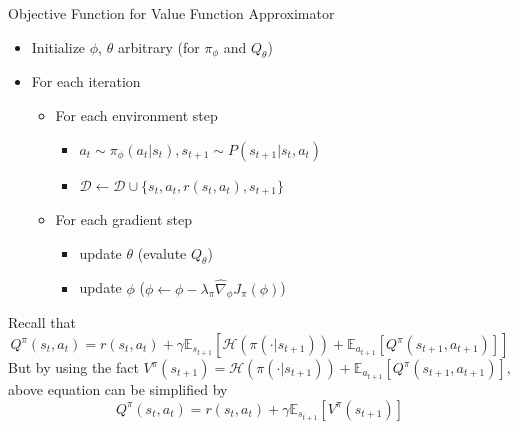 \documentclass[8pt]{beamer}
\begin{document}
\begin{frame}{Objective Function for Value Function Approximator}
    \begin{itemize}
        \item Initialize $\phi$, $\theta$ arbitrary (for $\pi_\phi$ and $Q_\theta$)
        \item For each iteration
        \begin{itemize}
            \item For each environment step
            \begin{itemize}
                \item $a_t \sim \pi_\phi(a_t | s_t), s_{t+1} \sim P(s_{t+1}|s_t, a_t)$
                \item $\mathcal{D} \leftarrow \mathcal{D} \cup \{s_t, a_t, r(s_t, a_t), s_{t+1}\}$            
            \end{itemize}
            \item For each gradient step
            \begin{itemize}
                \item update $\theta$ (evalute $Q_\theta$)
                \item update $\phi$ (\(\phi \leftarrow \phi - \lambda_\pi \hat{\nabla}_\phi J_\pi(\phi)\))
            \end{itemize}
        \end{itemize}
    \end{itemize}

    Recall that \[ Q^\pi (s_t,a_t) = r(s_t,a_t) + \gamma \mathbb{E}_{s_{t+1}} [\mathcal{H}(\pi(\cdot | s_{t+1})) + \mathbb{E}_{a_{t+1}}[Q^\pi (s_{t+1}, a_{t+1})]] \]
    But by using the fact \(V^\pi(s_{t+1}) = \mathcal{H}(\pi(\cdot | s_{t+1})) + \mathbb{E}_{a_{t+1}}[Q^\pi(s_{t+1}, a_{t+1})]\), above equation can be simplified by \[Q^\pi (s_t, a_t) = r(s_t, a_t) + \gamma \mathbb{E}_{s_{t+1}}[V^\pi (s_{t+1})]\]

\end{frame}
\end{document}
